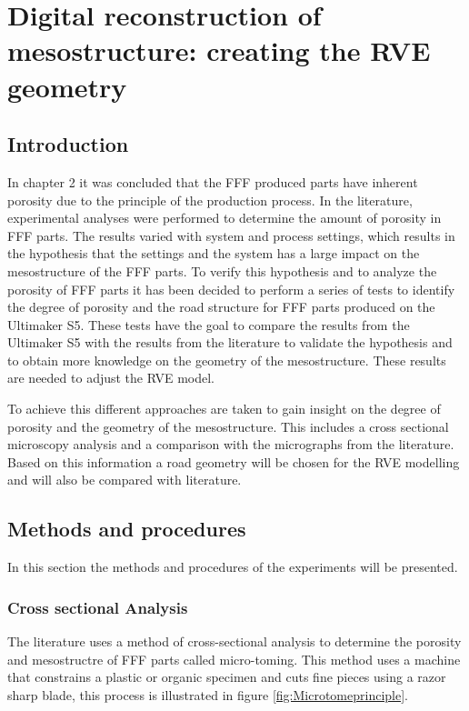 \chapter{Digital reconstruction of mesostructure: creating the RVE geometry}
\label{chp:4meso}

\graphicspath{{chapter_4/figures/}}
\graphicspath{{chapter_2/figures/}}%

\section{Introduction}
In chapter 2 it was concluded that the FFF produced parts have inherent porosity due to the principle of the production process. In the literature, experimental analyses were performed to determine the amount of porosity in FFF parts. The results varied with system and process settings, which results in the hypothesis that the settings and the system has a large impact on the mesostructure of the FFF parts. To verify this hypothesis and to analyze the porosity of FFF parts it has been decided to perform a series of tests to identify the degree of porosity and the road structure for FFF parts produced on the Ultimaker S5. These tests have the goal to compare the results from the Ultimaker S5 with the results from the literature to validate the hypothesis and to obtain more knowledge on the geometry of the mesostructure. These results are needed to adjust the RVE model.

To achieve this different approaches are taken to gain insight on the degree of porosity and the geometry of the mesostructure. This includes a cross sectional microscopy analysis and a comparison with the micrographs from the literature. Based on this information a road geometry will be chosen for the RVE modelling and will also be compared with literature.  %

\section{Methods and procedures}
In this section the methods and procedures of the experiments will be presented.
\subsection{Cross sectional Analysis}
The literature uses a method of cross-sectional analysis to determine the porosity and mesostructre of FFF parts called micro-toming. This method uses a machine that constrains a plastic or organic specimen and cuts fine pieces using a razor sharp blade, this process is illustrated in figure \ref{fig:Microtomeprinciple}.

